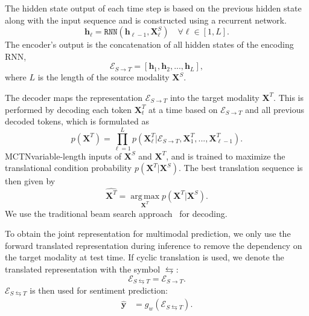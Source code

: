 \documentclass[letterpaper]{article} %
\newcommand{\citep}{\cite}
\newcommand{\ours}{MCTN}
\begin{document}
The hidden state output of each time step is based on the previous hidden state along with the input sequence and is constructed using a recurrent network.
\begin{equation}
\mathbf{h}_\ell = \mathtt{RNN}(\mathbf{h}_{\ell-1}, \mathbf{X}^{S}_\ell) \quad \forall \ell \in [1,L].
\end{equation}
The encoder's output is the concatenation of all hidden states of the encoding RNN,
\begin{equation}
\mathcal{E}_{S \rightarrow T} = [\mathbf{h}_{1}, \mathbf{h}_{2}, ..., \mathbf{h}_{L}],
\end{equation}
where $L$ is the length of the source modality $\mathbf{X}^{S}$.

The decoder maps the representation $\mathcal{E}_{S \rightarrow T}$ into the target modality $\mathbf{X}^{T}$. This is performed by decoding each token $\mathbf{X}^{T}_t$ at a time based on $\mathcal{E}_{S \rightarrow T}$ and all previous decoded tokens, which is formulated as
\begin{equation}
p(\mathbf{X}^{T}) = \prod_{\ell=1}^{L} p(\mathbf{X}^{T}_\ell|\mathcal{E}_{S \rightarrow T}, \mathbf{X}^{T}_1, ..., \mathbf{X}^{T}_{\ell-1}).
\end{equation}
\ours \accepts variable-length inputs of $\mathbf{X}^{S}$ and $\mathbf{X}^{T}$, and is trained to maximize the translational condition probability $p(\mathbf{X}^{T}|\mathbf{X}^{S})$. The best translation sequence is then given by
\begin{equation}
\hat{\mathbf{X}^{T}} = \operatorname*{arg\,max}_{\mathbf{X}^{T}} p(\mathbf{X}^{T}|\mathbf{X}^{S}).
\end{equation}
We use the traditional beam search approach~\citep{seq2seq_nn} 
for decoding. 

To obtain the joint representation for multimodal prediction, we 
only use
the forward translated representation during inference 
to remove the 
dependency on the target modality at test time.
If cyclic translation is used, we denote the translated representation with the symbol $\leftrightarrows$: 
\begin{equation}{\mathcal{E}}_{S \leftrightarrows T} = {\mathcal{E}}_{S \rightarrow T}.
\end{equation}
${\mathcal{E}}_{S \leftrightarrows T}$ is then used for sentiment prediction:
\begin{align}
\hat{\mathbf{y}}_{} &= g_{w}({\mathcal{E}}_{S \leftrightarrows T}).
\end{align}
\end{document}
